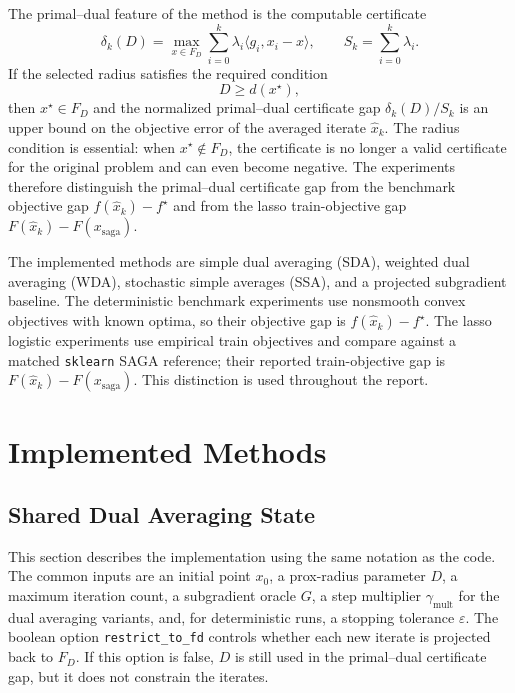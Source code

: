 \documentclass[11pt]{article}
\begin{document}
The primal--dual feature of the method is the computable certificate
\[
    \delta_k(D)=
    \max_{x\in F_D}\sum_{i=0}^k \lambda_i
    \langle g_i,x_i-x\rangle ,
    \qquad
    S_k=\sum_{i=0}^k\lambda_i .
\]
If the selected radius satisfies the required condition
\[
    D\ge d(x^\star),
\]
then \(x^\star\in F_D\) and the normalized primal--dual certificate gap
\(\delta_k(D)/S_k\) is an upper bound on the objective error of the averaged iterate
\(\hat x_k\).  The radius condition is essential: when
\(x^\star\notin F_D\), the certificate is no
longer a valid certificate for the original problem and can even become
negative.  The experiments therefore distinguish the primal--dual certificate
gap from the benchmark objective gap \(f(\hat x_k)-f^\star\) and from the lasso
train-objective gap \(F(\hat x_k)-F(x_{\mathrm{saga}})\).

The implemented methods are simple dual averaging (SDA), weighted dual
averaging (WDA), stochastic simple averages (SSA), and a projected subgradient
baseline.  The deterministic benchmark experiments use nonsmooth convex objectives with known
optima, so their objective gap is \(f(\hat x_k)-f^\star\).  The lasso logistic
experiments use empirical train objectives and compare against a matched
\texttt{sklearn} SAGA reference; their reported train-objective gap is
\(F(\hat x_k)-F(x_{\mathrm{saga}})\).  This distinction is used throughout the
report.

\section{Implemented Methods}
\subsection{Shared Dual Averaging State}

This section describes the implementation using the same notation as the code.
The common inputs are an initial point \(x_0\), a prox-radius parameter \(D\), a
maximum iteration count, a subgradient oracle \(G\), a step multiplier
\(\gamma_{\mathrm{mult}}\) for the dual averaging variants, and, for
deterministic runs, a stopping tolerance \(\varepsilon\).  The boolean option
\texttt{restrict\_to\_fd} controls whether each new iterate is projected back to
\(F_D\).  If this option is false, \(D\) is still used in the primal--dual
certificate gap, but it does not constrain the iterates.
\end{document}
